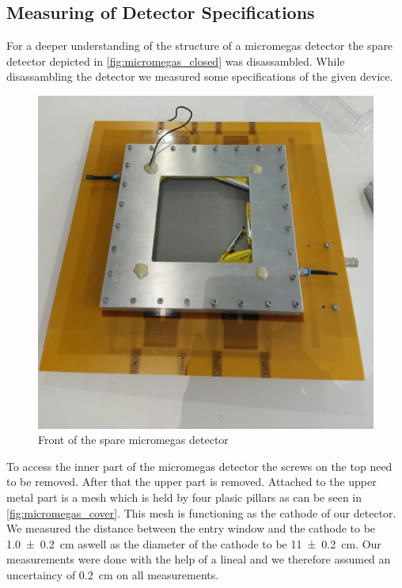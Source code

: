 \documentclass[sn-mathphys-num,iicol]{sn-jnl}
\theoremstyle{thmstyleone}
\theoremstyle{thmstyletwo}
\theoremstyle{thmstylethree}
\begin{document}
\subsection{Measuring of Detector Specifications} %
For a deeper understanding of the structure of a micromegas detector the spare detector depicted in \autoref{fig:micromegas_closed} was disassambled.
While disassambling the detector we measured some specifications of the given device.

\begin{figure}
  \includegraphics[width=\linewidth]{figures/micromegas_closed.jpeg}
  \caption{Front of the spare micromegas detector}
  \label{fig:micromegas_closed}
\end{figure}

To access the inner part of the micromegas detector the screws on the top need to be removed.
After that the upper part is removed. Attached to the upper metal part is a mesh which is held by four plasic pillars as can be seen in \autoref{fig:micromegas_cover}.
This mesh is functioning as the cathode of our detector. We measured the distance between the entry window and the cathode to be \SI{1.0\pm.2}{\centi\meter} aswell as the diameter of the cathode to be \SI{11\pm.2}{\centi\meter}.
Our measurements were done with the help of a lineal and we therefore assumed an uncertaincy of \SI{.2}{\centi\meter} on all measurements.
\end{document}
